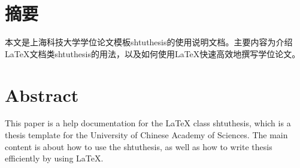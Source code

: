 \maketitle%
\MAKETITLE%
\makedeclaration%
\intobmk\chapter*{摘\quad 要}%
\setcounter{page}{1}%

本文是上海科技大学学位论文模板shtuthesis的使用说明文档。主要内容为介绍\LaTeX{}文档类shtuthesis的用法，以及如何使用\LaTeX{}快速高效地撰写学位论文。

\intobmk\chapter*{Abstract}%

This paper is a help documentation for the \LaTeX{} class shtuthesis, which is  a thesis template for the University of Chinese Academy of Sciences. The main content is about how to use the shtuthesis, as well as how to write thesis efficiently by using \LaTeX{}.

